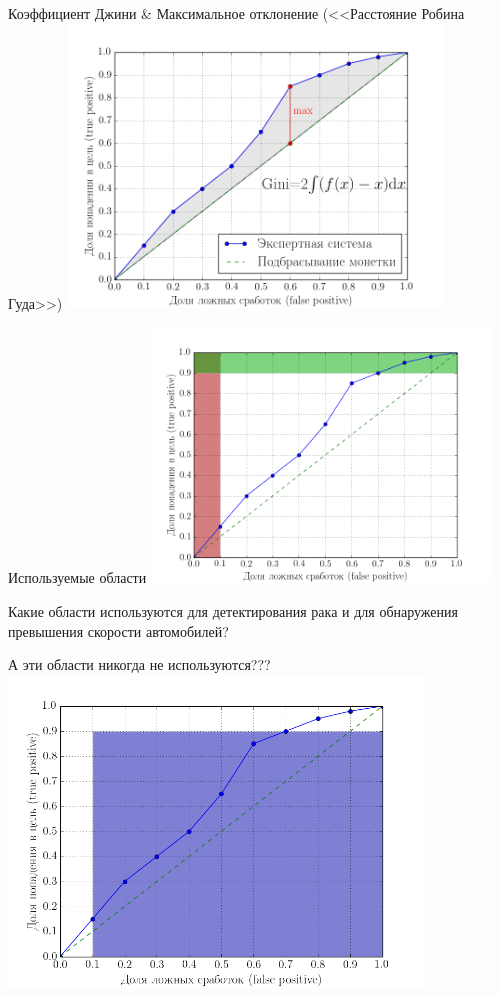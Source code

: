   \begin{frame}{Коэффициент Джини \& Максимальное отклонение (<<Расстояние Робина Гуда>>)}
   \includegraphics[width=10cm]{../pic/gini_coef.png}
  \end{frame}

  \begin{frame}{Используемые области}
	\includegraphics[width=9cm]{../pic/roc_example_2.png}
   \small
   
	Какие области используются для детектирования рака 
	и для обнаружения превышения скорости
	автомобилей?
   \end{frame}


  \begin{frame}{А эти области никогда не используются???}
	\includegraphics[width=11cm]{../pic/roc_example_3.png}

  \end{frame}

